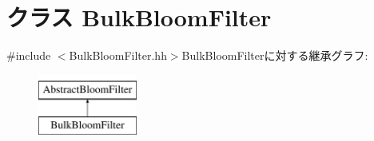 \hypertarget{classBulkBloomFilter}{
\section{クラス BulkBloomFilter}
\label{classBulkBloomFilter}
}


{\ttfamily \#include $<$BulkBloomFilter.hh$>$}BulkBloomFilterに対する継承グラフ:\begin{figure}[H]
\begin{center}
\leavevmode
\includegraphics[height=2cm]{classBulkBloomFilter}
\end{center}
\end{figure}
